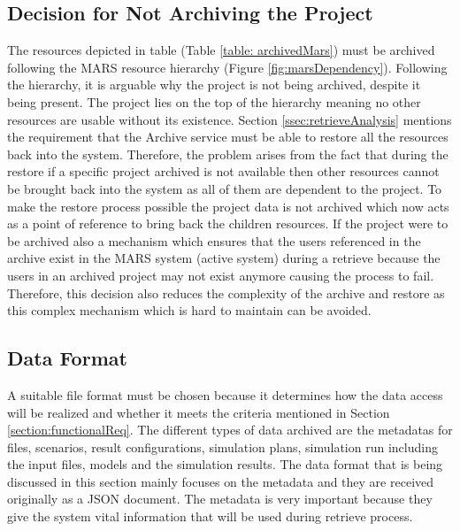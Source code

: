 \subsection{Decision for Not Archiving the Project}
The resources depicted in table (Table \ref{table: archivedMars}) must be archived following the MARS resource hierarchy (Figure \ref{fig:marsDependency}).
Following the hierarchy, it is arguable why the project is not being archived, despite it being present. The project lies on the top of the hierarchy 
meaning no other resources are usable without its existence. Section \ref{ssec:retrieveAnalysis} mentions the requirement that the Archive service must 
be able to restore all the resources back into the system. Therefore, the problem arises from the fact that during the restore if a specific project archived
is not available then other resources cannot be brought back into the system as all of them are dependent to the project. To make the restore process possible
the project data is not archived which now acts as a point of reference to bring back the children resources. If the project were to be archived also a mechanism
which ensures that the users referenced in the archive exist in the MARS system (active system) during a retrieve because the users in an
archived project may not exist anymore causing the process to fail. Therefore, this decision also reduces the complexity of the 
archive and restore as this complex mechanism which is hard to maintain can be avoided.


\subsection{Data Format}
A suitable file format must be chosen because it determines how the data access will be realized and whether it meets
the criteria mentioned in Section \ref{section:functionalReq}. The different types of data archived are the metadatas for files, scenarios, 
result configurations, simulation plans, simulation run including the input files, models and the simulation results. 
The data format that is being discussed in this section mainly focuses on the metadata and they are received originally as a JSON document.
The metadata is very important because they give the system vital information that will be used during retrieve process. 

